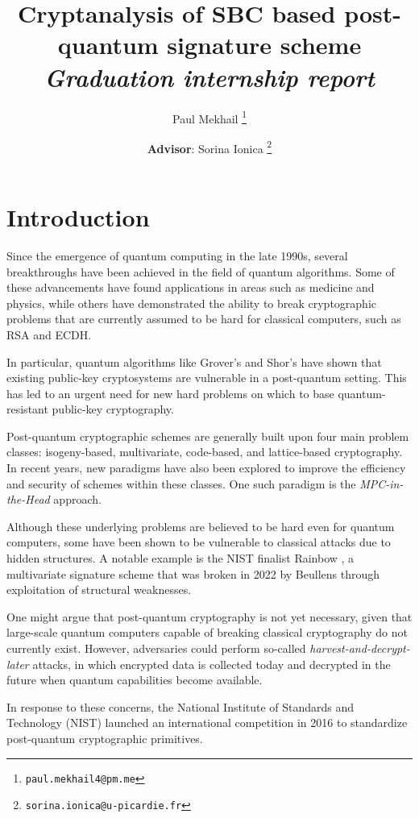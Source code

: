 \documentclass[english]{article}
\author{Paul Mekhail
	\thanks{\texttt{paul.mekhail4@pm.me}}}
\affil{Laboratoire MIS, Université de Picardie Jules Verne, Amiens, France\\Sorbonne Université, Paris, France}
\author{\textbf{Advisor}: Sorina Ionica
	\thanks{\texttt{sorina.ionica@u-picardie.fr}}}
\affil{Laboratoire MIS, Université de Picardie Jules Verne, Amiens, France}
\title{Cryptanalysis of SBC based post-quantum signature scheme \\\textit{Graduation internship report}}
\begin{document}
	\maketitle
	
	\section{Introduction}
		Since the emergence of quantum computing in the late 1990s, several breakthroughs have been achieved in the field of quantum algorithms. Some of these advancements have found applications in areas such as medicine and physics, while others have demonstrated the ability to break cryptographic problems that are currently assumed to be hard for classical computers, such as RSA \cite{RSA78} and ECDH.
		
		In particular, quantum algorithms like Grover's \cite{Grover} and Shor's \cite{Shor} have shown that existing public-key cryptosystems are vulnerable in a post-quantum setting. This has led to an urgent need for new hard problems on which to base quantum-resistant public-key cryptography.
		
		Post-quantum cryptographic schemes are generally built upon four main problem classes: isogeny-based, multivariate, code-based, and lattice-based cryptography. In recent years, new paradigms have also been explored to improve the efficiency and security of schemes within these classes. One such paradigm is the \emph{MPC-in-the-Head} approach.
		
		Although these underlying problems are believed to be hard even for quantum computers, some have been shown to be vulnerable to classical attacks due to hidden structures. A notable example is the NIST finalist Rainbow \cite{JD05}, a multivariate signature scheme that was broken in 2022 by Beullens \cite{Beu22} through exploitation of structural weaknesses.
	
		
		One might argue that post-quantum cryptography is not yet necessary, given that large-scale quantum computers capable of breaking classical cryptography do not currently exist. However, adversaries could perform so-called \emph{harvest-and-decrypt-later} attacks, in which encrypted data is collected today and decrypted in the future when quantum capabilities become available.
		
		In response to these concerns, the National Institute of Standards and Technology (NIST) launched an international competition in 2016 to standardize post-quantum cryptographic primitives.
	
\end{document}
